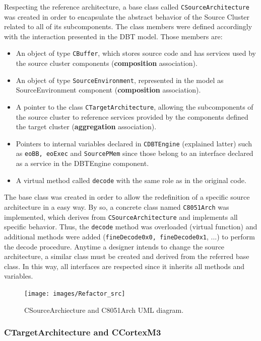 Respecting the reference architecture, a base class called \texttt{CSourceArchitecture} was created in order to encapsulate the abstract behavior of the Source Cluster related to all of its subcomponents. The class members were defined accordingly with the interaction presented in the DBT model. Those members are:
\begin{itemize}
\item An object of type \texttt{CBuffer}, which stores source code and has services used by the source cluster components (\textbf{composition} association).
\item An object of type \texttt{SourceEnvironment}, represented in the model as SourceEnvironment component (\textbf{composition} association).
\item A pointer to the class \texttt{CTargetArchitecture}, allowing the subcomponents of the source cluster to reference services provided by the components defined the target cluster (\textbf{aggregation} association).
\item Pointers to internal variables declared in \texttt{CDBTEngine} (explained latter) such as \texttt{eoBB, eoExec} and \texttt{SourcePMem} since those belong to an interface declared as a service in the DBTEngine component.
\item A virtual method called \texttt{decode} with the same role as in the original code.
\end{itemize} 

The base class was created in order to allow the redefinition of a specific source architecture in a easy way. By so, a concrete class named \texttt{C8051Arch} was implemented, which derives from \texttt{CSourceArchitecture} and implements all specific behavior. Thus, the \texttt{decode} method was overloaded (virtual function) and additional methods were added (\texttt{fineDecode0x0, fineDecode0x1}, ...) to perform the decode procedure. Anytime a designer intends to change the source architecture, a similar class must be created and derived from the referred base class. In this way, all interfaces are respected since it inherits all methods and variables.

\begin{figure}[!htb]
\centerline{
\texttt{[image: images/Refactor\_src]}
}
\caption{CSourceArchiecture and C8051Arch UML diagram.}
\label{fig:sourcearchitectureUML} 
\end{figure}



\subsubsection*{CTargetArchitecture and CCortexM3}

